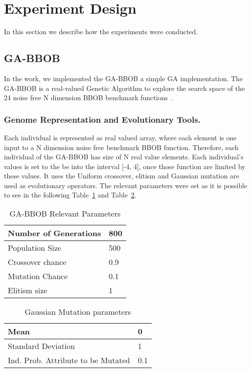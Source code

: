 \section{Experiment Design}

In this section we describe how the experiments were conducted.


\subsection{GA-BBOB}\label{sec:proposed:ga-bbob}

In the work, we implemented the GA-BBOB a simple GA implementation. The GA-BBOB is a real-valued Genetic Algorithm to explore the search space of the 24 noise free N dimension BBOB benchmark functions~\cite{hansen2010real}.

\subsubsection*{Genome Representation and Evolutionary Tools.}
Each individual is represented as real valued array, where each element is one input to a N dimension noise free benchmark BBOB function. Therefore, each individual of the GA-BBOB has size of N real value elements. Each individual's values is set to the be into the interval [-4, 4], once those function are limited by these values. It uses the Uniform crossover, elitism and Gaussian mutation are used as evolutionary operators. The relevant parameters were set as it is possible to see in the following Table~\ref{relevant_par} and Table~\ref{gaussian_par}.

\begin{table}[!ht]\label{relevant_par}
	\centering
	\caption{GA-BBOB Relevant Parameters}
	\vspace{2mm}
	\begin{tabular}{|l|l|}
	\hline
	Number of Generations & 800 \\ \hline
	Population Size &  500		\\ \hline
	Crossover chance 	& 0.9	\\ \hline
	Mutation Chance 	& 0.1	\\ \hline		
	Elitism size 		& 1		\\ \hline		
	\end{tabular}
\end{table}

%
\begin{table}[!ht]\label{gaussian_par}
	\centering
	\caption{Gaussian Mutation parameters}
	\vspace{2mm}
	\begin{tabular}{|l|l|}
	\hline
		Mean & 0 \\ \hline		
		Standard Deviation & 1 \\ \hline		
		Ind. Prob. Attribute to be Mutated &  0.1 \\ \hline		
	\end{tabular}
\end{table}

